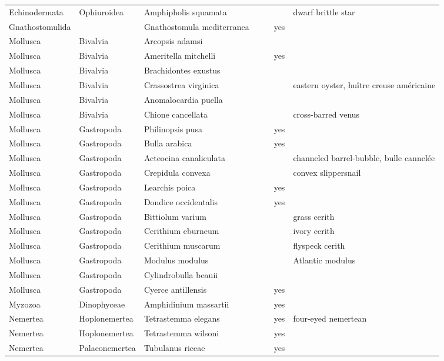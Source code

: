\begin{longtable}{lllllll}
  Echinodermata & Ophiuroidea & Amphipholis squamata &  &  &  & dwarf brittle star \\ 
  Gnathostomulida &  & Gnathostomula mediterranea &  &  & yes &  \\ 
  Mollusca & Bivalvia & Arcopsis adamsi &  &  &  &  \\ 
  Mollusca & Bivalvia & Ameritella mitchelli &  &  & yes &  \\ 
  Mollusca & Bivalvia & Brachidontes exustus &  &  &  &  \\ 
  Mollusca & Bivalvia & Crassostrea virginica &  &  &  & eastern oyster, huître creuse américaine \\ 
  Mollusca & Bivalvia & Anomalocardia puella &  &  &  &  \\ 
  Mollusca & Bivalvia & Chione cancellata &  &  &  & cross-barred venus \\ 
  Mollusca & Gastropoda & Philinopsis pusa &  &  & yes &  \\ 
  Mollusca & Gastropoda & Bulla arabica &  &  & yes &  \\ 
  Mollusca & Gastropoda & Acteocina canaliculata &  &  &  & channeled barrel-bubble, bulle cannelée \\ 
  Mollusca & Gastropoda & Crepidula convexa &  &  &  & convex slippersnail \\ 
  Mollusca & Gastropoda & Learchis poica &  &  & yes &  \\ 
  Mollusca & Gastropoda & Dondice occidentalis &  &  & yes &  \\ 
  Mollusca & Gastropoda & Bittiolum varium &  &  &  & grass cerith \\ 
  Mollusca & Gastropoda & Cerithium eburneum &  &  &  & ivory cerith \\ 
  Mollusca & Gastropoda & Cerithium muscarum &  &  &  & flyspeck cerith \\ 
  Mollusca & Gastropoda & Modulus modulus &  &  &  & Atlantic modulus \\ 
  Mollusca & Gastropoda & Cylindrobulla beauii &  &  &  &  \\ 
  Mollusca & Gastropoda & Cyerce antillensis &  &  & yes &  \\ 
  Myzozoa & Dinophyceae & Amphidinium massartii &  &  & yes &  \\ 
  Nemertea & Hoplonemertea & Tetrastemma elegans &  &  & yes & four-eyed nemertean \\ 
  Nemertea & Hoplonemertea & Tetrastemma wilsoni &  &  & yes &  \\ 
  Nemertea & Palaeonemertea & Tubulanus riceae &  &  & yes &  \\ 

\end{longtable}
